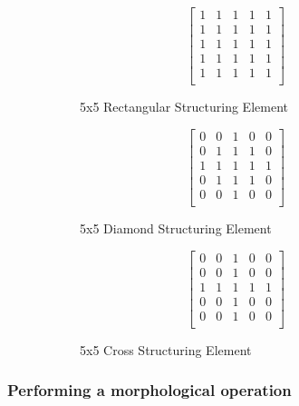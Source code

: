 \begin{figure}[htbp]
    \centering
    \begin{subfigure}[b]{0.3\textwidth}
           \[ \begin{bmatrix}
                1 & 1 & 1 & 1 & 1\\
                1 & 1 & 1 & 1 & 1\\
                1 & 1 & 1 & 1 & 1\\
                1 & 1 & 1 & 1 & 1\\
                1 & 1 & 1 & 1 & 1\\
             \end{bmatrix}\]
        \captionsetup{format = hang}
        \caption{5x5 Rectangular Structuring Element}
    \end{subfigure}
    \begin{subfigure}[b]{0.3\textwidth}
        \[\begin{bmatrix}
            0 & 0 & 1 & 0 & 0\\
            0 & 1 & 1 & 1 & 0\\
            1 & 1 & 1 & 1 & 1\\
            0 & 1 & 1 & 1 & 0\\
            0 & 0 & 1 & 0 & 0\\
         \end{bmatrix}\]
        \captionsetup{format = hang}
        \caption{5x5 Diamond Structuring Element}
    \end{subfigure} 
    \begin{subfigure}[b]{0.3\textwidth}
       \[\begin{bmatrix}
            0 & 0 & 1 & 0 & 0\\
            0 & 0 & 1 & 0 & 0\\
            1 & 1 & 1 & 1 & 1\\
            0 & 0 & 1 & 0 & 0\\
            0 & 0 & 1 & 0 & 0\\
         \end{bmatrix}\]
        \captionsetup{format = hang}
        \caption{5x5 Cross Structuring Element}
    \end{subfigure}
    \captionsetup{format = hang}
    \caption{}
    \label{fig:structuring_elements}
\end{figure}


\subsubsection{Performing a morphological operation}

